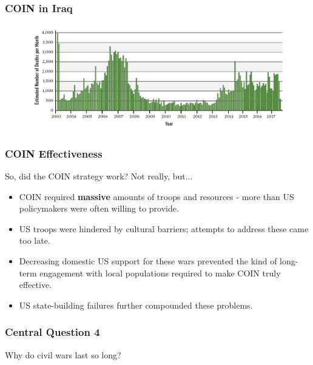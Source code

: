 \documentclass[handout]{beamer}
\begin{document}
\begin{frame} 
	\frametitle{\LARGE{COIN in Iraq}}
	\begin{figure}[ht!]
		\centering
		\includegraphics[width=\textwidth,height=\textheight,keepaspectratio]{./surge.png}
	\end{figure}
\end{frame}

\begin{frame} 
	\frametitle{\LARGE{COIN Effectiveness}}
So, did the COIN strategy work? Not really, but...
	\begin{itemize}
		\item COIN required \textbf{massive} amounts of troops and resources - more than US policymakers were often willing to provide. \pause
		\item US troops were hindered by cultural barriers; attempts to address these came too late. \pause
		\item Decreasing domestic US support for these wars prevented the kind of long-term engagement with local populations required to make COIN truly effective. \pause
		\item US state-building failures further compounded these problems.
	\end{itemize}
\end{frame}

\begin{frame} 
	\frametitle{\LARGE{Central Question 4}}
	\centering
	\Large{Why do civil wars last so long?} 
\end{frame}
\end{document}
